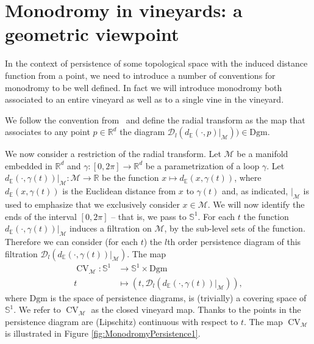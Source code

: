 \documentclass[twoside,leqno]{article}
\newcommand{\dgm}{\mathrm{Dgm}}
\newcommand\Sp{\mathbb{S}}
\newcommand{\M}{\mathcal{M}}
\newcommand{\Per}{\mathscr{D}}
\newcommand{\PF}{\operatorname{CV}}
\newcommand{\Rspace}       {{\mathbb R}}
\begin{document}
%

\section{Monodromy in vineyards: a geometric viewpoint}
\label{sec:MonodromyInVineyards}

In the context of persistence of some topological space with the induced distance function from a point, we need to introduce a number of conventions for monodromy to be well defined. In fact we will introduce monodromy both associated to an entire vineyard as well as to a single vine in the vineyard. 

\begin{definition}
We follow the convention from~\cite{onus2024shovingtubesshapesgives} and define the radial transform as the map that associates to any point $p \in \mathbb{R}^d$ the diagram $\Per_l (d_\mathbb{E} (\cdot, p )|_\M) ) \in \dgm $.
%
\end{definition}

We now consider a  restriction  of the radial transform.
Let $\M$ be a manifold embedded in $\mathbb{R}^d$ and $\gamma: [0,2\pi] \to \mathbb{R}^d$ be a parametrization of a loop $\gamma$. Let 
%
$d_{\mathbb{E}}(\cdot, \gamma(t) ) |_\M : \M \to \Rspace$ be the function $x \mapsto d_\mathbb{E} (x, \gamma(t))$,
%
%
where $d_\mathbb{E} (x, \gamma(t))$ is the Euclidean distance from $x$ to $\gamma(t)$ and, as indicated, $|_\M$ is used to emphasize that we exclusively consider $x \in \M$. %
We will now identify the ends of the interval $[0,2\pi]$ -- that is, we pass to $\Sp^1$. For each $t$ the function $d_\mathbb{E}(\cdot, \gamma(t) )|_\M$  induces a filtration on $\M$, by the sub-level sets of the function. Therefore we can consider (for each $t$) the $l$th order persistence diagram of this filtration $\Per_l (d_\mathbb{E}(\cdot, \gamma(t) )|_\M)$. 
The map 
\begin{align} 
\PF_{\M} : \Sp^1 &\to \Sp^1 \times \dgm \nonumber\\
t &\mapsto (t, \Per_l (d_\mathbb{E} (\cdot, \gamma(t) )|_\M) ), 
\nonumber
\end{align}
where  $\dgm$ is the space of persistence diagrams, is (trivially) a covering space of $\Sp^1$. We refer to $\PF_{\M}$ as the closed vineyard map. 
Thanks to \cite{cohen2005stability} the points in the persistence diagram are (Lipschitz) continuous with respect to $t$. The map  $\PF_{\M}$ is illustrated in Figure \ref{fig:MonodromyPersistence1}. 
\end{document}
